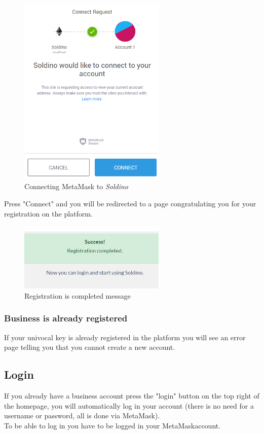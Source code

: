 	\begin{figure}[H]
		\includegraphics[width=7cm]{res/images/metamask_connect.png}
		\centering
		\caption{Connecting MetaMask to \textit{Soldino}}
	\end{figure}
	\noindent \noindent Press "Connect" and you will be redirected to a page 
	congratulating you for your registration on the platform.
	\begin{figure}[H]
		\includegraphics[width=7cm]{res/images/registration_complete.png}
		\centering
		\caption{Registration is completed message}
	\end{figure}
		\subsubsection{Business is already registered}
		If your univocal key is already registered in the platform you will 
		see an error page telling you that you cannot create a new account.
	\subsection{Login}
	If you already have a business account press the "login" button on the 
	top right of the homepage, you will automatically log in your account 
	(there is no need for a username or password, all is done via MetaMask). 
	\\To be able to log in you have to be logged in your MetaMask\glosp account.
